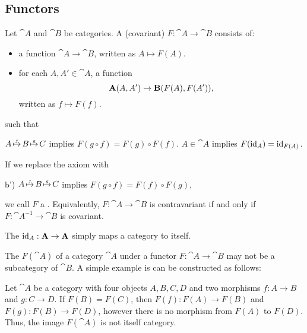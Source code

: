 \subsection{Functors}\label{subsec:functors}

\begin{definition}\label{def:functor}
  Let \( \cat{A} \) and \( \cat{B} \) be categories. A (covariant)  \( F: \cat{A} \to \cat{B} \) consists of:
  \begin{itemize}
    \item a function \( \cat{A} \to \cat{B} \), written as \( A \mapsto F(A) \).
    \item for each \( A, A' \in \cat{A} \), a function
          \begin{equation*}
            \operatorname{\mathbf{A}}(A, A') \to \operatorname{\mathbf{B}}(F(A), F(A')),
          \end{equation*}
          written as \( f \mapsto F(f) \).
  \end{itemize}
  such that
  \begin{thmenum}
     \( A \reloset f \mapsto B \reloset g \mapsto C \) implies \( F(g \circ f) = F(g) \circ F(f) \).
     \( A \in \cat{A} \) implies \( F(\operatorname{id}_A) = \operatorname{id}_{F(A)} \).
  \end{thmenum}

  If we replace the axiom  with
  \begin{thmenum}
    \item[b')]\label{def:functor/contravariant_composition_axiom} \( A \reloset f \mapsto B \reloset g \mapsto C \) implies \( F(g \circ f) = F(f) \circ F(g) \),
  \end{thmenum}
  we call \( F \) a . Equivalently, \( F: \cat{A} \to \cat{B} \) is contravariant if and only if \( F: \cat{A}^{-1} \to \cat{B} \) is covariant.

  The  \( \operatorname{id}_A: \operatorname{\mathbf{A}} \to \operatorname{\mathbf{A}} \) simply maps a category to itself.
\end{definition}

\begin{remark}\label{rem:image_of_functor_maybe_not_subcategory}
  The  \( F(\cat{A}) \) of a category \( \cat{A} \) under a functor \( F: \cat{A} \to \cat{B} \) may not be a subcategory of \( \cat{B} \). A simple example is can be constructed as follows:

  Let \( \cat{A} \) be a category with four objects \( A, B, C, D \) and two morphisms \( f: A \to B \) and \( g: C \to D \). If \( F(B) = F(C) \), then \( F(f): F(A) \to F(B) \) and \( F(g): F(B) \to F(D) \), however there is no morphism from \( F(A) \) to \( F(D) \). Thus, the image \( F(\cat{A}) \) is not itself category.
\end{remark}

